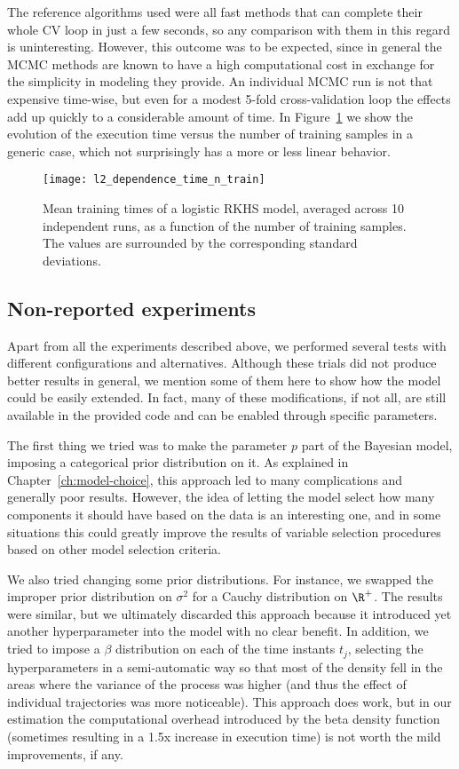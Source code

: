 The reference algorithms used were all fast methods that can complete their whole CV loop in just a few seconds, so any comparison with them in this regard is uninteresting. However, this outcome was to be expected, since in general the MCMC methods are known to have a high computational cost in exchange for the simplicity in modeling they provide. An individual MCMC run is not that expensive time-wise, but even for a modest 5-fold cross-validation loop the effects add up quickly to a considerable amount of time. In Figure~\ref{fig:dependence_time_n_train} we show the evolution of the execution time versus the number of training samples in a generic case, which not surprisingly has a more or less linear behavior.

\begin{figure}[ht!]
  \centering
  \texttt{[image: l2\_dependence\_time\_n\_train]}
  \caption{Mean training times of a logistic RKHS model, averaged across 10 independent runs, as a function of the number of training samples. The values are surrounded by the corresponding standard deviations. }\label{fig:dependence_time_n_train}
\end{figure}

\subsection*{Non-reported experiments}

Apart from all the experiments described above, we performed several tests with different configurations and alternatives. Although these trials did not produce better results in general, we mention some of them here to show how the model could be easily extended. In fact, many of these modifications, if not all, are still available in the provided code and can be enabled through specific parameters.

The first thing we tried was to make the parameter \(p\) part of the Bayesian model, imposing a categorical prior distribution on it. As explained in Chapter~\ref{ch:model-choice}, this approach led to many complications and generally poor results. However, the idea of letting the model select how many components it should have based on the data is an interesting one, and in some situations this could greatly improve the results of variable selection procedures based on other model selection criteria.

We also tried changing some prior distributions. For instance, we swapped the improper prior distribution on \(\sigma^2\) for a Cauchy distribution on \(\R^+\). The results were similar, but we ultimately discarded this approach because it introduced yet another hyperparameter into the model with no clear benefit. In addition, we tried to impose a \(\beta\) distribution on each of the time instants \(t_j\), selecting the hyperparameters in a semi-automatic way so that most of the density fell in the areas where the variance of the process was higher (and thus the effect of individual trajectories was more noticeable). This approach does work, but in our estimation the computational overhead introduced by the beta density function (sometimes resulting in a 1.5x increase in execution time) is not worth the mild improvements, if any.

